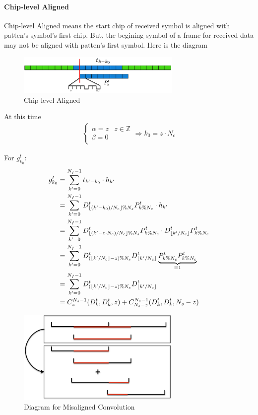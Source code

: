 \documentclass[a4paper]{article}
\DeclarePairedDelimiter\floor{\lfloor}{\rfloor}
\begin{document}
\paragraph{Chip-level Aligned} %
\label{par:chip_level_aligned}
Chip-level Aligned means the start chip of received symbol is aligned with patten's symbol's first chip. But, the begining symbol of a frame for received data may not be aligned with patten's first symbol. Here is the diagram
\begin{figure}[ht]
	\centering
	\includegraphics[width = 3.1in]{figure/chip_level_aligned.png}
	\caption{Chip-level Aligned}
	\label{fig:Chip-level aligned}
\end{figure}

At this time
\begin{align}
	\begin{cases}
		\alpha = z &z \in \mathbb{Z}\\
		\beta = 0 &
	\end{cases}
	\Rightarrow k_0 = z \cdot N_c
\end{align}

For $g^t_{k_0}$: \label{eq:chip-level aligned-training}
\begin{align}
	g^t_{k_0}
	&= \sum_{k' = 0}^{N_f-1} t_{k'-k_0} \cdot h_{k'}\\
	&= \sum_{k' = 0}^{N_f-1} D^t_{\floor{(k'-k_0) / N_c}\%N_s} P^t_{k \% N_c} \cdot h_{k'}\\
	&= \sum_{k' = 0}^{N_f-1} D^t_{\floor{(k'-z \cdot N_c) / N_c}\%N_s} P^t_{k \% N_c} \cdot D^t_{\floor{k'/N_c}} P^t_{k \% N_c}\\
	&= \sum_{k' = 0}^{N_f-1} D^t_{(\floor{k' / N_c} - z)\%N_s} D^t_{\floor{k'/N_c}} \underbrace{P^t_{k \% N_c} P^t_{k \% N_c}}_{\equiv 1}\\
	&= \sum_{k' = 0}^{N_f-1} D^t_{(\floor{k' / N_c} - z)\%N_s} D^t_{\floor{k'/N_c}}\\
	&= C_z^{N_s-1}(D_k^t, D_k^t, z) + C_{N_s - z}^{N_s-1}(D_k^t, D_k^t, N_s - z)
\end{align}
\begin{figure}[ht]
	\centering
	\includegraphics[width=3.1in]{figure/misaligned_conv.png}
	\caption{Diagram for Misaligned Convolution}
	\label{fig:Diagram for Misaligned Convolution}
\end{figure}
\end{document}

